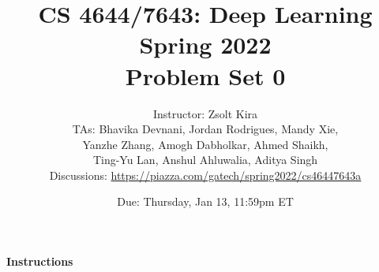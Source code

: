 \documentclass[11pt,english, answers]{exam}
\begin{document}
\title{CS 4644/7643: Deep Learning\\
Spring 2022 \\
Problem Set 0}
\author{Instructor: Zsolt Kira \\
TAs: Bhavika Devnani, Jordan Rodrigues, Mandy Xie, \\Yanzhe Zhang, Amogh Dabholkar, Ahmed Shaikh, \\ Ting-Yu Lan, Anshul Ahluwalia, Aditya Singh \\
Discussions: \url{https://piazza.com/gatech/spring2022/cs46447643a}}
\date{Due: Thursday, Jan 13, 11:59pm ET}

\maketitle

\paragraph*{Instructions}
\end{document}
